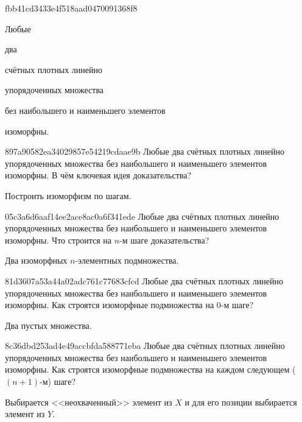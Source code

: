 \begin{note}{fbb41cd3433e4f518aad0470091368f8}
    \begin{icloze}{4}Любые\end{icloze} два \begin{icloze}{3}счётных плотных линейно\end{icloze} упорядоченных множества \begin{icloze}{2}без наибольшего и наименьшего элементов\end{icloze} \begin{icloze}{1}изоморфны.\end{icloze}
\end{note}

\begin{note}{897a90582ea34029857e54219cdaae9b}
    Любые два счётных плотных линейно упорядоченных множества без наибольшего и наименьшего элементов изоморфны.
    В чём ключевая идея доказательства?

    \begin{cloze}{1}
        Построить изоморфизм по шагам.
    \end{cloze}
\end{note}

\begin{note}{05c3a6d6aaf14ee2ace8ac0a6f341ede}
    Любые два счётных плотных линейно упорядоченных множества без наибольшего и наименьшего элементов изоморфны.
    Что строится на \({ n }\)-м шаге доказательства?

    \begin{cloze}{1}
        Два изоморфных \({ n }\)-элементных подмножества.
    \end{cloze}
\end{note}

\begin{note}{81d3607a53a44a02adc761c77683cfcd}
    Любые два счётных плотных линейно упорядоченных множества без наибольшего и наименьшего элементов изоморфны.
    Как строятся изоморфные подмножества на \({ 0 }\)-м шаге?

    \begin{cloze}{1}
        Два пустых множества.
    \end{cloze}
\end{note}

\begin{note}{8c36dbd253ad4e49accbfda588771eba}
    Любые два счётных плотных линейно упорядоченных множества без наибольшего и наименьшего элементов изоморфны.
    Как строятся изоморфные подмножества на каждом следующем (\({ (n+1) }\)-м) шаге?

    \begin{cloze}{1}
        Выбирается <<неохваченный>> элемент из \({ X }\) и для его позиции выбирается элемент из \({ Y }\).
    \end{cloze}
\end{note}

